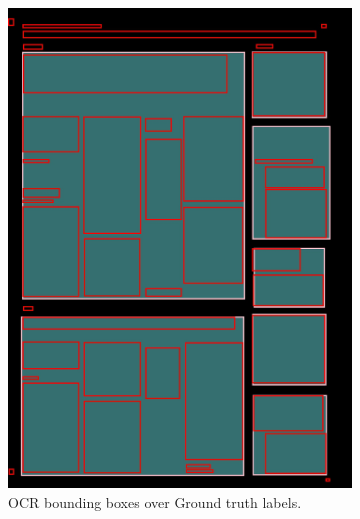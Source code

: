\documentclass[oneside, english, bibtex]{kththesis}
\begin{document}
\begin{figure}[!htb]
\begin{adjustbox}{center,max size={\textwidth}{0.9\textheight}}
{\begin{subfigure}{0.6\textwidth}
\includegraphics[width=\linewidth]{figures/ocr_bbox/AVThDFz.jpg}
  \caption{OCR bounding boxes over Ground truth labels.}
  \label{fig:AVThDFz_GTbb}
\end{subfigure}
\begin{subfigure}{0.6\textwidth}
  \centering

\end{subfigure}}
\end{adjustbox}
\end{figure}
\end{document}
